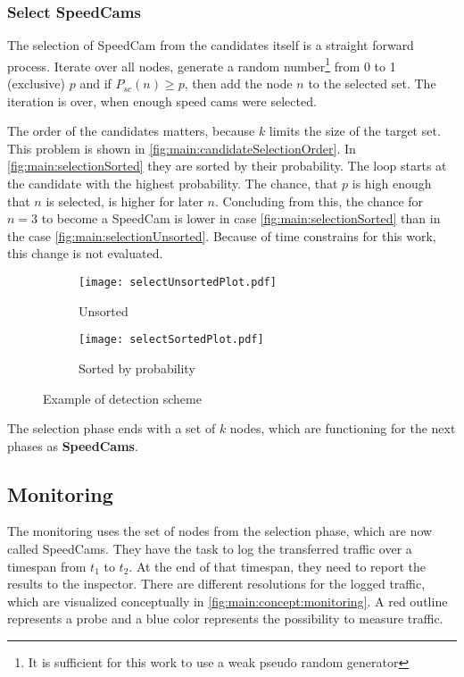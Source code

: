 \documentclass[thesis.tex]{subfiles}
\begin{document}
\subsubsection{Select SpeedCams} \label{sec:main:selectionPhase:selecting}

The selection of SpeedCam from the candidates itself is a straight forward process. Iterate over all nodes, generate a random number\footnote{It is sufficient for this work to use a weak pseudo random generator} from 0 to 1 (exclusive) $p$ and if $P_{sc}(n) \geq p$, then add the node $n$ to the selected set. The iteration is over, when enough speed cams were selected.

The order of the candidates matters, because $k$ limits the size of the target set. This problem is shown in \autoref{fig:main:candidateSelectionOrder}. In \autoref{fig:main:selectionSorted} they are sorted by their probability. The loop starts at the candidate with the highest probability. The chance, that $p$ is high enough that $n$ is selected, is higher for later $n$. Concluding from this, the chance for $n=3$ to become a SpeedCam is lower in case \autoref{fig:main:selectionSorted} than in the case \autoref{fig:main:selectionUnsorted}. Because of time constrains for this work, this change is not evaluated.
\begin{figure}[h]
    \begin{subfigure}{.45\linewidth}
        \centering
        \texttt{[image: selectUnsortedPlot.pdf]}
        \caption{Unsorted}
        \label{fig:main:selectionUnsorted}
    \end{subfigure}%
    \begin{subfigure}{0.45\linewidth}
        \centering
        \texttt{[image: selectSortedPlot.pdf]}
        \caption{Sorted by probability}
        \label{fig:main:selectionSorted}
    \end{subfigure}
    \caption{Example of detection scheme}
    \label{fig:main:candidateSelectionOrder}
\end{figure}

The selection phase ends with a set of $k$ nodes, which are functioning for the next phases as \textbf{SpeedCams}.

\subsection{Monitoring} \label{sec:main:monitoringphase}
The monitoring uses the set of nodes from the selection phase, which are now called SpeedCams. They have the task to log the transferred traffic over a timespan from $t_1$ to $t_2$. At the end of that timespan, they need to report the results to the inspector. There are different resolutions for the logged traffic, which are visualized conceptually in \autoref{fig:main:concept:monitoring}. A red outline represents a probe and a blue color represents the possibility to measure traffic.
\end{document}
